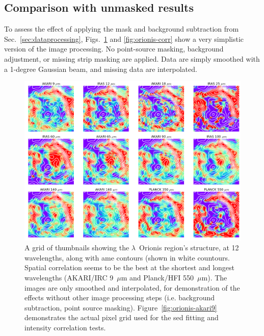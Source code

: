     \subsection{Comparison with unmasked results}
        To assess the effect of applying the mask and background subtraction from Sec.~\ref{sec:dataprocessing}, Figs.~\ref{fig:orionis-img} and \ref{fig:orionis-corr} show a very simplistic version of the image processing. No point-source masking, background adjustment, or missing strip masking are applied. Data are simply smoothed with a 1-degree Gaussian beam, and missing data are interpolated.
          \begin{figure}
            \includegraphics[width=\textwidth]{../Plots/lOrionis_grid_img.png}
            \centering
            \caption{A grid of thumbnails showing the $\lambda$~Orionis region's structure, at 12 wavelengths, along with \acrshort{ame} contours (shown in white countours. Spatial correlation seems to be the best at the shortest and longest wavelengths (AKARI/IRC 9~$\mu$m and Planck/HFI 550~$\mu$m). The images are only smoothed and interpolated, for demonstration of the effects without other image processing steps (i.e. background subtraction, point source masking). Figure~\ref{fig:orionis-akari9} demonstrates the actual pixel grid used for the \acrshort{sed} fitting and intensity correlation tests.}
            \label{fig:orionis-img}
          \end{figure}
